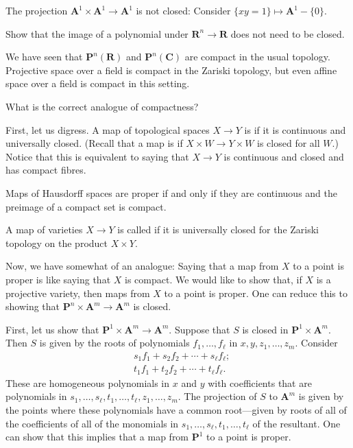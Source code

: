 \documentclass[11pt, oneside,margin=1in]{article}
\begin{document}
\begin{example}[ ]\label{}\text{}
The projection $\mathbf{A}^1\times \mathbf{A}^1 \longrightarrow \mathbf{A}^1$ is not closed: Consider $\{xy=1\}\longmapsto \mathbf{A}^1-\{0\}$.
\end{example}

\begin{exercise}\label{}\text{}
Show that the image of a polynomial under $\mathbf{R}^n\longrightarrow \mathbf{R}$ does not need to be closed.
\end{exercise}

We have seen that $\mathbf{P}^n(\mathbf{R})$ and $\mathbf{P}^n(\mathbf{C})$ are compact in the usual topology. Projective space over a field is compact in the Zariski topology, but even affine space over a field is compact in this setting.

\begin{problem}
	What is the correct analogue of compactness?
\end{problem}

First, let us digress. A map of topological spaces $X\longrightarrow Y$ is  if it is continuous and universally closed. (Recall that a map is  if $X\times W\longrightarrow Y\times W$ is closed for all $W$.) Notice that this is equivalent to saying that $X\longrightarrow Y$ is continuous and closed and has compact fibres.

Maps of Hausdorff spaces are proper if and only if they are continuous and the preimage of a compact set is compact.

A map of varieties $X\longrightarrow Y$ is called  if it is universally closed for the Zariski topology on the product $X\times Y$. 

Now, we have somewhat of an analogue: Saying that a map from $X$ to a point is proper is like saying that $X$ is compact. We would like to show that, if $X$ is a projective variety, then maps from $X$ to a point is proper. One can reduce this to showing that $\mathbf{P}^n\times \mathbf{A}^m\longrightarrow \mathbf{A}^m$ is closed.

First, let us show that $\mathbf{P}^1\times \mathbf{A}^m\longrightarrow \mathbf{A}^m$. Suppose that $S$ is closed in $\mathbf{P}^1\times \mathbf{A}^m$. Then $S$ is given by the roots of polynomials $f_1,\hdots, f_\ell$ in $x,y, z_1,\hdots,z_m$. Consider 
\begin{align*}
	&s_1f_1+s_2f_2+\cdots+s_\ell f_\ell;\\
	&t_1f_1+t_2f_2+\cdots+t_\ell f_\ell.
\end{align*}
These are homogeneous polynomials in $x$ and $y$ with coefficients that are polynomials in $s_1,\hdots,s_\ell,t_1,\hdots, t_\ell,z_1,\hdots, z_m$. The projection of $S$ to $\mathbf{A}^m$ is given by the points where these polynomials have a common root---given by roots of all of the coefficients of all of the monomials in $s_1,\hdots,s_\ell,t_1,\hdots, t_\ell$ of the resultant. One can show that this implies that a map from $\mathbf{P}^1$ to a point is proper.
\end{document}
